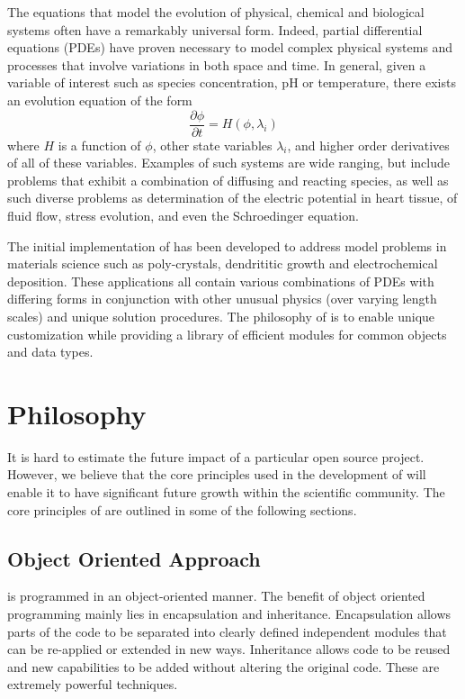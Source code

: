 The equations that model the evolution of physical, chemical and
biological systems often have a remarkably universal form. Indeed,
partial differential equations (PDEs) have proven necessary to model
complex physical systems and processes that involve variations in both
space and time.  In general, given a variable of interest such as
species concentration, pH or temperature, there exists an evolution
equation of the form
\begin{equation}
  \frac{\partial \phi}{\partial t} = H(\phi, \lambda_i)
  \label{eqn:general-equation}
\end{equation}
where $H$ is a function of $\phi$, other state variables $\lambda_i$,
and higher order derivatives of all of these variables. Examples of
such systems are wide ranging, but include problems that exhibit a
combination of diffusing and reacting species, as well as such diverse
problems as determination of the electric potential in heart tissue,
of fluid flow, stress evolution, and even the Schroedinger equation.

The initial implementation of \FiPy{} has been developed to address
model problems in materials science such as poly-crystals, dendrititic
growth and electrochemical deposition. These applications all contain
various combinations of PDEs with differing forms in conjunction with
other unusual physics (over varying length scales) and unique solution
procedures. The philosophy of \FiPy{} is to enable unique
customization while providing a library of efficient modules for
common objects and data types.

\section{\FiPy{} Philosophy}

It is hard to estimate the future impact of a particular open source
project. However, we believe that the core principles used in the
development of \FiPy{} will enable it to have significant future
growth within the scientific community. The core principles of \FiPy{}
are outlined in some of the following sections.

\subsection{Object Oriented Approach}

\FiPy{} is programmed in an object-oriented manner. The benefit of object
oriented programming mainly lies in encapsulation and
inheritance. Encapsulation allows parts of the code to be separated
into clearly defined independent modules that can be re-applied or
extended in new ways. Inheritance allows code to be reused and new
capabilities to be added without altering the original code. These are
extremely powerful techniques.

